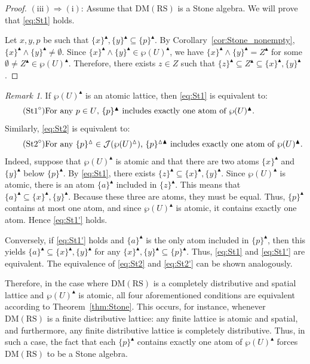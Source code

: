 \documentclass[11pt,a4paper]{amsart}
\newcommand{\UP}{\blacktriangle}
\newcommand{\Up}{\vartriangle}
\theoremstyle{plain}
\theoremstyle{definition}
\theoremstyle{remark}
\newtheorem{remark}[theorem]{Remark}
\numberwithin{equation}{section}
\begin{document}
\begin{proof}
\smallskip\noindent%
$\mathrm{(iii)}\Rightarrow\mathrm{(i)}$: 
Assume that $\mathrm{DM(RS)}$ is a Stone
algebra. We will prove that \eqref{eq:St1} holds. 

Let $x,y,p$ be such that  
$\{x\}^\UP, \{y\}^\UP \subseteq \{p\}^\UP$.
By Corollary~\ref{cor:Stone_nonempty}, 
$\{x\}^\UP \wedge \{y\}^\UP \neq \emptyset$.
Since $\{x\}^\UP\wedge\{y\}^\UP\in\wp(U)^\UP$, 
we have  $\{x\}^\UP\wedge\{y\}^{\UP}=Z^\UP$ for some 
$\emptyset \neq Z^\UP\in\wp(U)^\UP$. 
Therefore, there exists $z\in Z$ such that
$\{z\}^\UP\subseteq Z^\UP\subseteq \{x\}^\UP,\{y\}^\UP$. 
\end{proof}

\begin{remark} \label{rem:finite_stone}
If $\wp (U)^\UP$ is an atomic lattice,
then \eqref{eq:St1} is equivalent to: 
\begin{equation} \tag{$\text{St1}^\circ$} \label{eq:St1'}
\begin{minipage}[c]{0.9\textwidth}
For any $p \in U$, $\{p\}^\UP $ includes exactly one atom
of $\wp(U)^\UP$.
\end{minipage}
\end{equation}
Similarly, \eqref{eq:St2} is equivalent to:
\begin{equation} \tag{$\text{St2}^\circ$} \label{eq:St2'}
\begin{minipage}[c]{0.9\textwidth}
    For any $\{p\}^\Up \in \mathcal{J}(\wp(U)^\Up)$, $\{p\}^{\Up \UP}$ includes exactly one atom of $\wp(U)^\UP$.
\end{minipage}
\end{equation}
Indeed, suppose that $\wp(U)^\UP$ is atomic and that 
there are two atoms $\{x\}^\UP$ and $\{y\}^\UP$ below
$\{p\}^\UP$.
By \eqref{eq:St1}, there exists $\{z\}^\UP \subseteq
\{x\}^\UP, \{y\}^\UP$. Since $\wp(U)^\UP$ is atomic,
there is an atom $\{a\}^\UP$ included in $\{z\}^\UP$. 
This means that $\{a\}^\UP \subseteq \{x\}^\UP, \{y\}^\UP$.
Because these three are atoms, they must be equal. Thus,
$\{p\}^\UP$ contains at most one atom, and since $\wp(U)^\UP$ is 
atomic, it contains exactly one atom. Hence \eqref{eq:St1'} holds.


Conversely, if \eqref{eq:St1'} holds and $\{a\}^\UP$ is the only atom included in $\{p\}^\UP$, 
then this yields $\{a\}^\UP \subseteq \{x\}^\UP,\{y\}^\UP$ for any 
$\{x\}^\UP,\{y\}^\UP \subseteq  \{p\}^\UP$.
Thus, \eqref{eq:St1} and \eqref{eq:St1'} are equivalent.
The equivalence of \eqref{eq:St2} and \eqref{eq:St2'} can be 
shown analogously.

Therefore, in the case where $\mathrm{DM(RS)}$ is a completely 
distributive and spatial lattice and $\wp(U)^\UP$ is atomic, 
all four aforementioned conditions are equivalent according to
Theorem~\ref{thm:Stone}. This occurs, for instance, 
whenever $\mathrm{DM(RS)}$  is a finite distributive lattice: 
any finite lattice is atomic and spatial, and furthermore, any
finite distributive lattice is completely distributive. Thus, in
such a case, the fact that each $\{p\}^\UP$ contains exactly one
atom of $\wp(U)^\UP$ forces $\mathrm{DM(RS)}$ to be a Stone algebra.
\end{remark}
\end{document}
